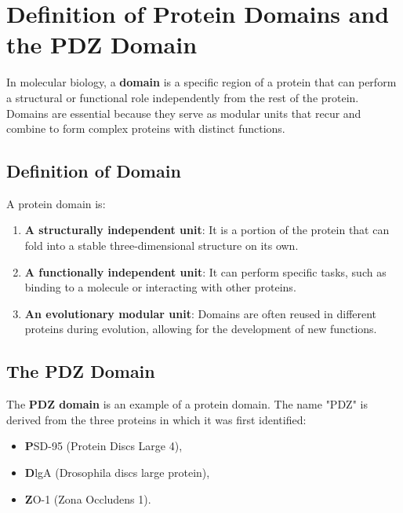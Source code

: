 \documentclass[English, Lau, oneside]{sapthesis}
\begin{document}
\section*{Definition of Protein Domains and the PDZ Domain}

In molecular biology, a \textbf{domain} is a specific region of a protein that can perform a structural or functional role independently from the rest of the protein. Domains are essential because they serve as modular units that recur and combine to form complex proteins with distinct functions.

\subsection*{Definition of Domain}
A protein domain is:
\begin{enumerate}
    \item \textbf{A structurally independent unit}: It is a portion of the protein that can fold into a stable three-dimensional structure on its own.
    \item \textbf{A functionally independent unit}: It can perform specific tasks, such as binding to a molecule or interacting with other proteins.
    \item \textbf{An evolutionary modular unit}: Domains are often reused in different proteins during evolution, allowing for the development of new functions.
\end{enumerate}

\subsection*{The PDZ Domain}
The \textbf{PDZ domain} is an example of a protein domain. The name "PDZ" is derived from the three proteins in which it was first identified:
\begin{itemize}
    \item \textbf{P}SD-95 (Protein Discs Large 4),
    \item \textbf{D}lgA (Drosophila discs large protein),
    \item \textbf{Z}O-1 (Zona Occludens 1).
\end{itemize}
\end{document}
